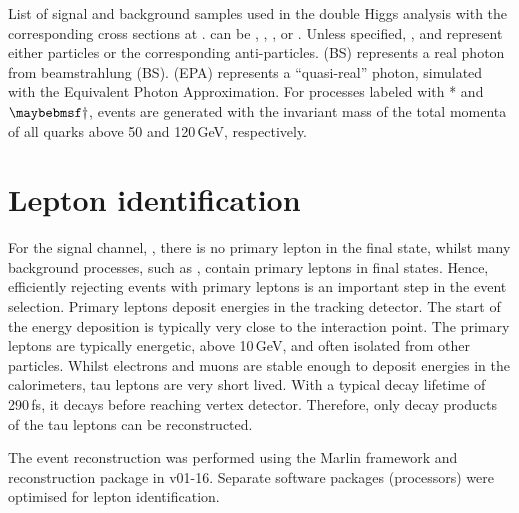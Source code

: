 \begin{table}[!tbp]
\caption[Signal and background samples with the corresponding cross sections at .]
{List of signal and background samples used in the double Higgs analysis with the corresponding cross sections at . \Pquark can be \Pup, \Pdown, \Pstrange, \Pbottom or \Ptop. Unless specified, \Pquark, \Plepton and \Pnu represent either particles or the corresponding anti-particles. \Pphoton(BS) represents a real photon from beamstrahlung (BS). \Pphoton(EPA) represents a ``quasi-real'' photon, simulated with the Equivalent Photon Approximation. For processes labeled with * and $\myDagger$, events are generated with the invariant mass of the total momenta of all quarks above 50 and 120\,GeV, respectively.}
\label{tab:doubleHiggsMCSamples}
\end{table}

\section{Lepton identification}
\label{sec:doubleHiggsLepton}

For the signal channel, \eeToHHbbWWHad, there is no primary lepton in the final state, whilst many background  processes, such as \HepProcess{\Pquark \Pquark \Pquark \Pquark \Plepton \Pnu}, contain primary leptons in final states. Hence, efficiently rejecting events with primary leptons is an important step in the event selection. Primary leptons deposit energies in the tracking detector. The start of the energy deposition is typically very close to the interaction point. The primary leptons are typically energetic, above 10\,GeV, and often isolated from other particles. Whilst electrons and muons are stable enough to deposit energies in the calorimeters, tau leptons are very short lived. With a typical decay lifetime of 290\,fs\cite{Agashe:2014kda}, it decays before reaching vertex detector. Therefore, only decay products of the tau leptons can be reconstructed.


The event reconstruction was performed using the Marlin framework and reconstruction package in \ilcsoft v01-16. Separate software packages (processors) were optimised for lepton identification. %



